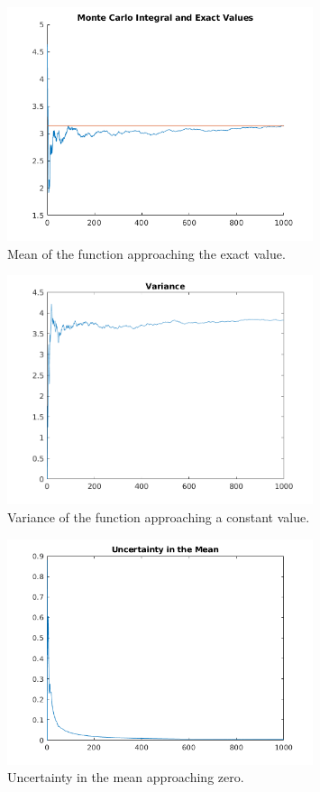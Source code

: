 \documentclass{article}
\begin{document}
\begin{enumerate}
    \begin{figure}[H]
      \centering
      \includegraphics[width=0.8\textwidth]{integral}
      \caption{Mean of the function approaching the exact value.}
      \label{fig:integral}
    \end{figure}
    \begin{figure}[H]
      \centering
      \includegraphics[width=0.8\textwidth]{variance}
      \caption{Variance of the function approaching a constant value.}
      \label{fig:variance}
    \end{figure}
    \begin{figure}[H]
      \centering
      \includegraphics[width=0.8\textwidth]{uncertainty}
      \caption{Uncertainty in the mean approaching zero.}
      \label{fig:uncertainty}
    \end{figure}


\end{enumerate}
\end{document}
